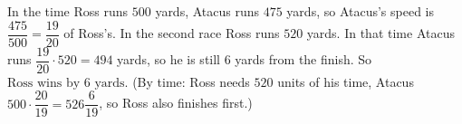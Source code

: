 In the time Ross runs $500$ yards, Atacus runs $475$ yards, so Atacus's speed is $\dfrac{475}{500}=\dfrac{19}{20}$ of Ross's. In the second race Ross runs $520$ yards. In that time Atacus runs $\dfrac{19}{20}\cdot520=494$ yards, so he is still $6$ yards from the finish. So $\boxed{\text{Ross wins by }6\text{ yards}}$. (By time: Ross needs $520$ units of his time, Atacus $500\cdot\dfrac{20}{19}=526\dfrac{6}{19}$, so Ross also finishes first.)
